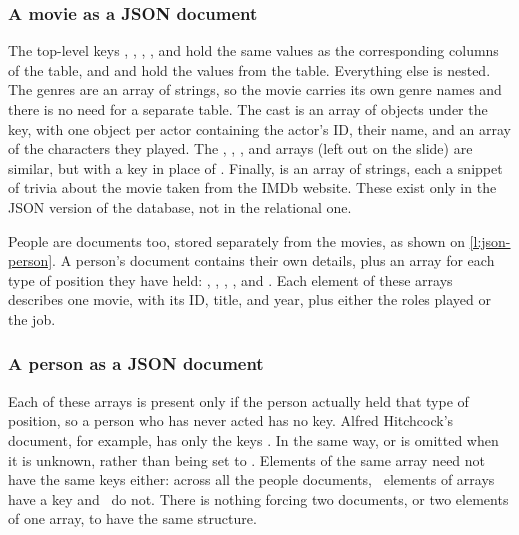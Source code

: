 \begin{frame}
    \label{s:json-movie}
    \frametitle{A movie as a JSON document}
    {\scriptsize}
\end{frame}
\label{l:json-movie}

The top-level keys , , , , and  hold the same values as the corresponding columns of the  table, and  and  hold the values from the  table.
Everything else is nested.
The genres are an array of strings, so the movie carries its own genre names and there is no need for a separate  table.
The cast is an array of objects under the  key, with one object per actor containing the actor's ID, their name, and an array of the characters they played.
The , , , and  arrays (left out on the slide) are similar, but with a  key in place of .
Finally,  is an array of strings, each a snippet of trivia about the movie taken from the IMDb website.
These exist only in the JSON version of the database, not in the relational one.

People are documents too, stored separately from the movies, as shown on \autoref{l:json-person}.
A person's document contains their own details, plus an array for each type of position they have held: , , , , and .
Each element of these arrays describes one movie, with its ID, title, and year, plus either the roles played or the job.

\begin{frame}
    \label{s:json-person}
    \frametitle{A person as a JSON document}
    {\scriptsize}
\end{frame}
\label{l:json-person}

Each of these arrays is present only if the person actually held that type of position, so a person who has never acted has no  key.
Alfred Hitchcock's document, for example, has only the keys .
In the same way,  or  is omitted when it is unknown, rather than being set to .
Elements of the same array need not have the same keys either: across all the people documents, \jsondirectedjob\ elements of  arrays have a  key and \jsondirectednojob\ do not.
There is nothing forcing two documents, or two elements of one array, to have the same structure.


